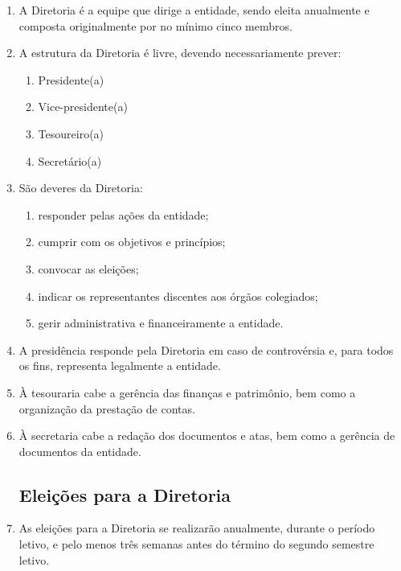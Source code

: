 \documentclass[12pt,a4paper]{article}
\begin{document}
\begin{enumerate}[label=\textbf{Art. \arabic*º.}]
    \item A Diretoria é a equipe que dirige a entidade, sendo eleita anualmente e composta originalmente por no mínimo cinco membros.

    \item A estrutura da Diretoria é livre, devendo necessariamente prever:
    \begin{enumerate}[label=\textbf{\Roman* - }]
        \item Presidente(a)
        \item Vice-presidente(a)
        \item Tesoureiro(a)
        \item Secretário(a)
    \end{enumerate}

    \item São deveres da Diretoria:
    \begin{enumerate}[label=\textbf{\Roman* - }]
        \item responder pelas ações da entidade;
        \item cumprir com os objetivos e princípios;
        \item convocar as eleições;
        \item indicar os representantes discentes aos órgãos colegiados;
        \item gerir administrativa e financeiramente a entidade.
    \end{enumerate}

    \item A presidência responde pela Diretoria em caso de controvérsia e, para todos os fins, representa legalmente a entidade.

    \item À tesouraria cabe a gerência das finanças e patrimônio, bem como a organização da prestação de contas.

    \item À secretaria cabe a redação dos documentos e atas, bem como a gerência de documentos da entidade.

\subsection{Eleições para a Diretoria}

    \item As eleições para a Diretoria se realizarão anualmente, durante o período letivo, e pelo menos três semanas antes do término do segundo semestre letivo.


\end{enumerate}
\end{document}
